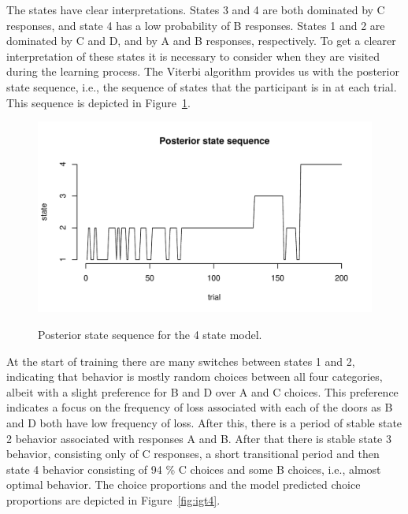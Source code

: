 \documentclass[a4paper,12pt,man]{apa} %
\newcommand{\citep}{\cite}
\begin{document}
The states have clear interpretations.  States 3 and 4 are both
dominated by C responses, and state 4 has a low probability of B
responses.  States 1 and 2 are dominated by C and D, and by A and B
responses, respectively.  To get a clearer interpretation of these
states it is necessary to consider when they are visited during the
learning process.  The Viterbi algorithm \citep{Rabiner1989} provides
us with the posterior state sequence, i.e., the sequence of states
that the participant is in at each trial.  This sequence is depicted
in Figure~\ref{fig:post4}.


\begin{figure}
\begin{center}
	\includegraphics[width=\textwidth]{graphs/post4.pdf}
	\label{fig:post4}
	\caption{Posterior state sequence for the 4 state model.}
\end{center}
\end{figure}

At the start of training there are many switches between states 1 and 
2, indicating that behavior is mostly random choices between all four 
categories, albeit with a slight preference for B and D over A and C
choices. This preference indicates a focus on the frequency of loss
associated with each of the doors as B and D both have low frequency of
loss. After this, there is a period of stable state 2 behavior
associated with responses A and B. After that there is stable state 3 
behavior, consisting only of C responses, a short transitional period 
and then state 4 behavior consisting of 94 \% C choices and some B
choices, i.e., almost optimal behavior. The choice proportions and the
model predicted choice proportions are depicted in
Figure~\ref{fig:igt4}. 
\end{document}
